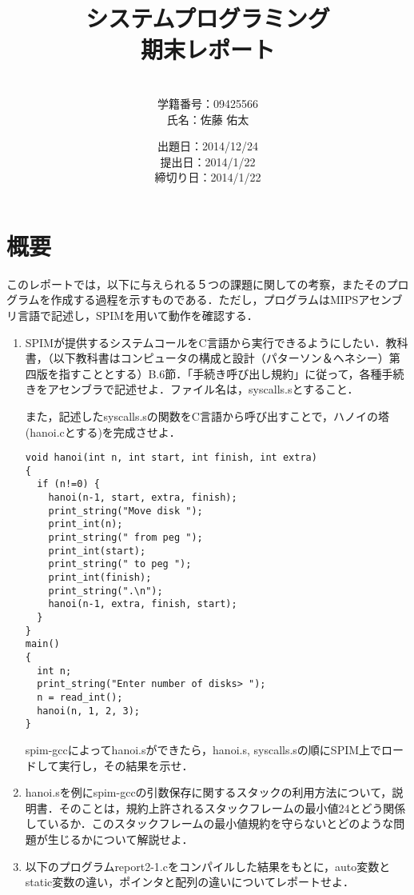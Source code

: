 \documentclass[a4j]{jarticle}
\title{システムプログラミング\\期末レポート}
\author{\\学籍番号：09425566\\氏名：佐藤 佑太}
\date{出題日：2014/12/24\\提出日：2014/1/22\\締切り日：2014/1/22\\}
\begin{document}
\maketitle

\newpage



%
%

\section{概要}

このレポートでは，以下に与えられる５つの課題に関しての考察，またそのプログラムを作成する過程を示すものである．ただし，プログラムはMIPSアセンブリ言語で記述し，SPIMを用いて動作を確認する．


\begin{enumerate}

\item SPIMが提供するシステムコールをC言語から実行できるようにしたい．教科書，（以下教科書はコンピュータの構成と設計（パターソン＆ヘネシー）第四版を指すこととする）B.6節．「手続き呼び出し規約」に従って，各種手続きをアセンブラで記述せよ．ファイル名は，syscalls.sとすること．　

また，記述したsyscalls.sの関数をC言語から呼び出すことで，ハノイの塔(hanoi.cとする)を完成させよ．

{\baselineskip 3mm
\begin{verbatim}
void hanoi(int n, int start, int finish, int extra)
{
  if (n!=0) {
    hanoi(n-1, start, extra, finish);
    print_string("Move disk ");
    print_int(n);
    print_string(" from peg ");
    print_int(start);
    print_string(" to peg ");
    print_int(finish);
    print_string(".\n");
    hanoi(n-1, extra, finish, start);
  }
}
main()
{
  int n;
  print_string("Enter number of disks> ");
  n = read_int();
  hanoi(n, 1, 2, 3);
}
\end{verbatim}
}

spim-gccによってhanoi.sができたら，hanoi.s, syscalls.sの順にSPIM上でロードして実行し，その結果を示せ．

\item hanoi.sを例にspim-gccの引数保存に関するスタックの利用方法について，説明書．そのことは，規約上許されるスタックフレームの最小値24とどう関係しているか．このスタックフレームの最小値規約を守らないとどのような問題が生じるかについて解説せよ．


\item 以下のプログラムreport2-1.cをコンパイルした結果をもとに，auto変数とstatic変数の違い，ポインタと配列の違いについてレポートせよ．


\end{enumerate}
\end{document}
